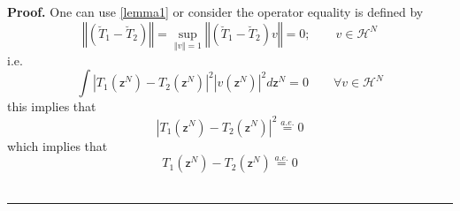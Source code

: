 \documentclass[aps,preprint]{revtex4}
\newenvironment{proof}[1][Proof]{\noindent\textbf{#1.} }{\ \rule{0.5em}{0.5em}}
\begin{document}
\begin{proof}
One can use \ref{lemma1} or consider the operator equality is defined by 
\begin{equation}
\left\Vert \left( \breve{T}_{1}-\breve{T}_{2}\right) \right\Vert
=\sup_{\left\Vert v\right\Vert =1}\left\Vert \left( \breve{T}_{1}-\breve{T}%
_{2}\right) v\right\Vert =0;\qquad v\in \mathcal{H}^{N}
\end{equation}%
i.e. 
\begin{equation}
\int \left\vert T_{1}\left( \mathsf{z}^{N}\right) -T_{2}\left( \mathsf{z}%
^{N}\right) \right\vert ^{2}\left\vert v\left( \mathsf{z}^{N}\right)
\right\vert ^{2}d\mathsf{z}^{N}=0\qquad \forall v\in \mathcal{H}^{N}
\end{equation}%
this implies that 
\begin{equation}
\left\vert T_{1}\left( \mathsf{z}^{N}\right) -T_{2}\left( \mathsf{z}%
^{N}\right) \right\vert ^{2}\overset{a.e.}{=}0
\end{equation}%
which implies that 
\begin{equation}
T_{1}\left( \mathsf{z}^{N}\right) -T_{2}\left( \mathsf{z}^{N}\right) \overset%
{a.e.}{=}0
\end{equation}
\end{proof}
\end{document}
